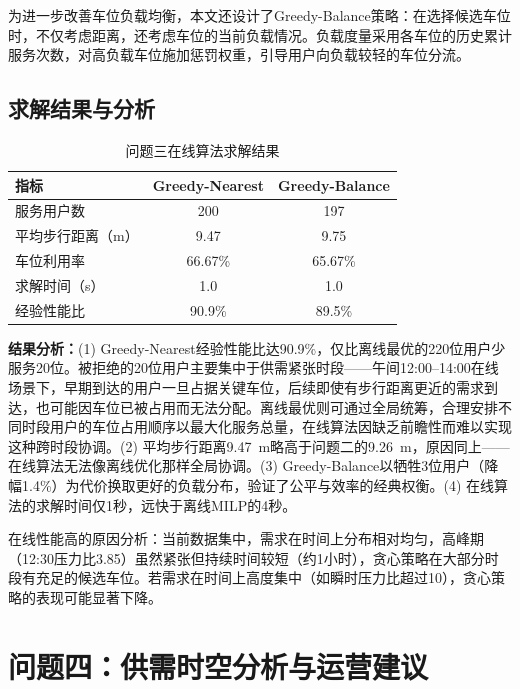 \documentclass[12pt,a4paper]{ctexart}
\begin{document}
为进一步改善车位负载均衡，本文还设计了Greedy-Balance策略：在选择候选车位时，不仅考虑距离，还考虑车位的当前负载情况。负载度量采用各车位的历史累计服务次数，对高负载车位施加惩罚权重，引导用户向负载较轻的车位分流。

\subsection{求解结果与分析}

\begin{table}[H]
  \centering
  \caption{问题三在线算法求解结果}
  \label{tab:q3result}
  \begin{tabular}{lcc}
    \toprule
    指标 & Greedy-Nearest & Greedy-Balance \\
    \midrule
    服务用户数 & 200 & 197 \\
    平均步行距离（m） & 9.47 & 9.75 \\
    车位利用率 & 66.67\% & 65.67\% \\
    求解时间（s） & 1.0 & 1.0 \\
    经验性能比 & 90.9\% & 89.5\% \\
    \bottomrule
  \end{tabular}
\end{table}

\textbf{结果分析：}(1) Greedy-Nearest经验性能比达90.9\%，仅比离线最优的220位用户少服务20位。被拒绝的20位用户主要集中于供需紧张时段——午间12:00--14:00在线场景下，早期到达的用户一旦占据关键车位，后续即使有步行距离更近的需求到达，也可能因车位已被占用而无法分配。离线最优则可通过全局统筹，合理安排不同时段用户的车位占用顺序以最大化服务总量，在线算法因缺乏前瞻性而难以实现这种跨时段协调。(2) 平均步行距离9.47~m略高于问题二的9.26~m，原因同上——在线算法无法像离线优化那样全局协调。(3) Greedy-Balance以牺牲3位用户（降幅1.4\%）为代价换取更好的负载分布，验证了公平与效率的经典权衡。(4) 在线算法的求解时间仅1秒，远快于离线MILP的4秒。

在线性能高的原因分析：当前数据集中，需求在时间上分布相对均匀，高峰期（12:30压力比3.85）虽然紧张但持续时间较短（约1小时），贪心策略在大部分时段有充足的候选车位。若需求在时间上高度集中（如瞬时压力比超过10），贪心策略的表现可能显著下降。


\section{问题四：供需时空分析与运营建议}
\end{document}
